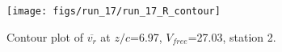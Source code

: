 \begin{figure}[H]
\centering
\texttt{[image: figs/run\_17/run\_17\_R\_contour]}
\caption{Contour plot of $\overline{v_{r}}$ at $z/c$=6.97, $V_{free}$=27.03, station 2.}
\label{fig:run_17_R_contour}
\end{figure}


